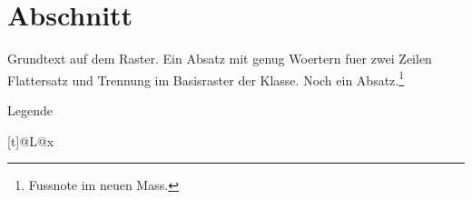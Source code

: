 \documentclass[lang=english]{swisstex}
\begin{document}
\section{Abschnitt}
Grundtext auf dem Raster. Ein Absatz mit genug Woertern fuer zwei Zeilen
Flattersatz und Trennung im Basisraster der Klasse.
Noch ein Absatz.\footnote{Fussnote im neuen Mass.}
\begin{swisstable}{Legende}\begin{tabularx}{\textcolumn}[t]{@{}L@{}}x\\\end{tabularx}\end{swisstable}
\end{document}
